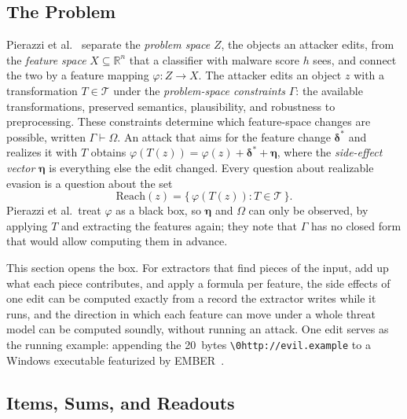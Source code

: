 
\subsection{The Problem}
\label{sec:fw:problem}

Pierazzi et al.~\cite{pierazzi2020intriguing} separate the \emph{problem space} $Z$, the objects an attacker edits,
from the \emph{feature space} $X \subseteq \mathbb{R}^n$ that a classifier with malware score $h$ sees, and connect
the two by a feature mapping $\varphi: Z \to X$. The attacker edits an object $z$ with a transformation
$T \in \mathcal{T}$ under the \emph{problem-space constraints} $\Gamma$: the available transformations, preserved
semantics, plausibility, and robustness to preprocessing. These constraints determine which feature-space changes are
possible, written $\Gamma \vdash \Omega$. An attack that aims for the feature change $\boldsymbol{\delta}^*$ and
realizes it with $T$ obtains $\varphi(T(z)) = \varphi(z) + \boldsymbol{\delta}^* + \boldsymbol{\eta}$, where the
\emph{side-effect vector} $\boldsymbol{\eta}$ is everything else the edit changed. Every question about realizable
evasion is a question about the set
\[
  \mathrm{Reach}(z) = \{\, \varphi(T(z)) : T \in \mathcal{T} \,\}.
\]
Pierazzi et al.\ treat $\varphi$ as a black box, so $\boldsymbol{\eta}$ and $\Omega$ can only be observed, by applying
$T$ and extracting the features again; they note that $\Gamma$ has no closed form that would allow computing them in
advance.

This section opens the box. For extractors that find pieces of the input, add up what each piece contributes, and
apply a formula per feature, the side effects of one edit can be computed exactly from a record the extractor writes
while it runs, and the direction in which each feature can move under a whole threat model can be computed soundly,
without running an attack. One edit serves as the running example: appending the 20~bytes
\texttt{\textbackslash 0http://evil.example} to a Windows executable featurized by EMBER~\cite{anderson2018ember}.

\subsection{Items, Sums, and Readouts}
\label{sec:fw:model}

